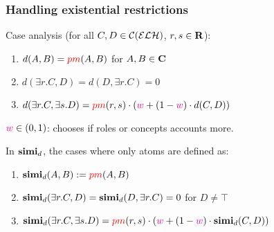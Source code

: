 \documentclass[smaller, dvipsnames]{beamer}
\begin{document}
\begin{frame}
  \frametitle{Handling existential restrictions}
  Case analysis (for all \(C,D \in \mathcal{C}(\mathcal{ELH})\), \(r,s \in \mathbf{R}\)):
  \begin{enumerate}
    \item \(d(A,B) = \textcolor{red}{pm}(A,B)\) for \(A,B \in \mathbf{C}\)
    \item \(d(\exists{}r.C,D) = d(D,\exists{}r.C) = 0\)
    \item \(d(\exists{}r.C,\exists{}s.D) =
    \textcolor{red}{pm}(r,s) \cdot \left(\textcolor{magenta}{w} + (1-\textcolor{magenta}{w}) \cdot d(C,D)\right)\)
  \end{enumerate}
  \(\textcolor{magenta}{w} \in (0,1)\): chooses if roles or concepts accounts more.

  \pause
  In \(\operatorname{\mathbf{simi}}_d\), the cases where only \alert{atoms} are defined as:
  \begin{tcolorbox}
    \begin{enumerate}
      \item \(\operatorname{\mathbf{simi}}_d(A,B) := \textcolor{red}{pm}(A,B)\)
      \item \(\operatorname{\mathbf{simi}}_d(\exists{}r.C,D) = \operatorname{\mathbf{simi}}_d(D,\exists{}r.C) = 0\) for \(D \ne \top\)
      \item \(\operatorname{\mathbf{simi}}_d(\exists{}r.C,\exists{}s.D) =
      \textcolor{red}{pm}(r,s) \cdot \left(\textcolor{magenta}{w} + (1-\textcolor{magenta}{w}) \cdot \operatorname{\mathbf{simi}}_d(C,D)\right)\)
    \end{enumerate}
  \end{tcolorbox}
\end{frame}
\end{document}
